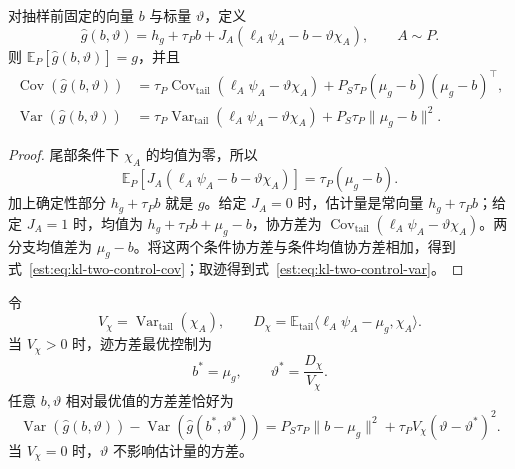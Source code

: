 \documentclass[lang=cn,scheme=chinese,openany]{../book/elegantbook}
\newcommand{\E}{\mathbb E}
\newcommand{\Var}{\operatorname{Var}}
\newcommand{\tail}{\mathrm{tail}}
\begin{document}
\begin{theorem}[双控制估计量及其精确协方差]
\label{est:thm:kl-two-controls}
对抽样前固定的向量 $b$ 与标量 $\vartheta$，定义
\begin{equation*}
 \widehat g(b,\vartheta)
 =h_g+\tau_Pb+J_A(\ell_A\psi_A-b-\vartheta \chi_A),\qquad A\sim P.
\end{equation*}
则 $\E_P[\widehat g(b,\vartheta)]=g$，并且
\begin{align}
 \operatorname{Cov}(\widehat g(b,\vartheta))
 &=\tau_P\operatorname{Cov}_{\tail}(\ell_A\psi_A-\vartheta \chi_A)
   +P_S\tau_P(\mu_g-b)(\mu_g-b)^\top, \label{est:eq:kl-two-control-cov}\\
 \Var(\widehat g(b,\vartheta))
 &=\tau_P\Var_{\tail}(\ell_A\psi_A-\vartheta \chi_A)
   +P_S\tau_P\lVert\mu_g-b\rVert^2. \label{est:eq:kl-two-control-var}
\end{align}
\end{theorem}

\begin{proof}
尾部条件下 $\chi_A$ 的均值为零，所以
\begin{equation*}
 \E_P[J_A(\ell_A\psi_A-b-\vartheta \chi_A)]
 =\tau_P(\mu_g-b).
\end{equation*}
加上确定性部分 $h_g+\tau_Pb$ 就是 $g$。给定 $J_A=0$ 时，估计量是常向量 $h_g+\tau_Pb$；给定 $J_A=1$ 时，均值为 $h_g+\tau_Pb+\mu_g-b$，协方差为 $\operatorname{Cov}_{\tail}(\ell_A\psi_A-\vartheta \chi_A)$。两分支均值差为 $\mu_g-b$。将这两个条件协方差与条件均值协方差相加，得到式~\eqref{est:eq:kl-two-control-cov}；取迹得到式~\eqref{est:eq:kl-two-control-var}。
\end{proof}

\begin{theorem}[双控制的最优值与精确代价]
令
\begin{equation*}
 V_\chi=\Var_{\tail}(\chi_A),\qquad
 D_\chi=\E_{\tail}\langle \ell_A\psi_A-\mu_g,\chi_A\rangle.
\end{equation*}
当 $V_\chi>0$ 时，迹方差最优控制为
\begin{equation*}
 b^*=\mu_g,\qquad \vartheta^*=\frac{D_\chi}{V_\chi}.
\end{equation*}
任意 $b,\vartheta$ 相对最优值的方差差恰好为
\begin{equation}
 \Var(\widehat g(b,\vartheta))-\Var(\widehat g(b^*,\vartheta^*))
 =P_S\tau_P\lVert b-\mu_g\rVert^2
  +\tau_PV_\chi(\vartheta-\vartheta^*)^2.
 \label{est:eq:kl-two-control-regret}
\end{equation}
当 $V_\chi=0$ 时，$\vartheta$ 不影响估计量的方差。
\end{theorem}
\end{document}
